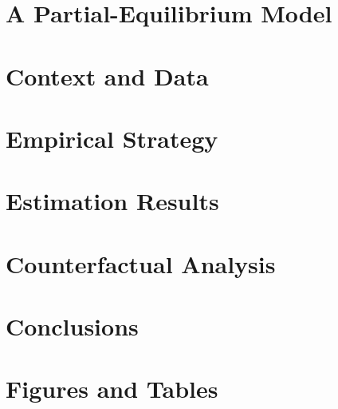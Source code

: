 \documentclass{article}
\begin{document}
\section{A Partial-Equilibrium Model}\label{sec:model}
    

\section{Context and Data}\label{sec:data}
    

\section{Empirical Strategy}\label{sec:empirical_strategy}
    

\section{Estimation Results}\label{sec:results}
    

\section{Counterfactual Analysis}\label{sec:counterfactual}
    

\section{Conclusions}\label{sec:conclusion}
    



\clearpage
\printbibliography

\clearpage
\section*{Figures and Tables}


\clearpage

\clearpage

\clearpage

\clearpage

\clearpage

\clearpage

\end{document}
